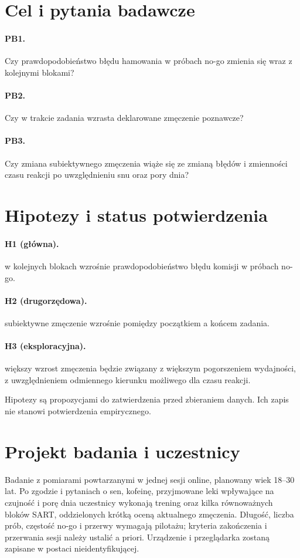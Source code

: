 \documentclass[11pt,a4paper]{article}
\begin{document}
\section{Cel i pytania badawcze}
\paragraph{PB1.} Czy prawdopodobieństwo błędu hamowania w próbach no-go zmienia się wraz z kolejnymi blokami?

\paragraph{PB2.} Czy w trakcie zadania wzrasta deklarowane zmęczenie poznawcze?

\paragraph{PB3.} Czy zmiana subiektywnego zmęczenia wiąże się ze zmianą błędów i zmienności czasu reakcji po uwzględnieniu snu oraz pory dnia?

\section{Hipotezy i status potwierdzenia}
\paragraph{H1 (główna).} w kolejnych blokach wzrośnie prawdopodobieństwo błędu komisji w próbach no-go.

\paragraph{H2 (drugorzędowa).} subiektywne zmęczenie wzrośnie pomiędzy początkiem a końcem zadania.

\paragraph{H3 (eksploracyjna).} większy wzrost zmęczenia będzie związany z większym pogorszeniem wydajności, z uwzględnieniem odmiennego kierunku możliwego dla czasu reakcji.

Hipotezy są propozycjami do zatwierdzenia przed zbieraniem danych. Ich zapis nie stanowi potwierdzenia empirycznego.
\section{Projekt badania i uczestnicy}
Badanie z pomiarami powtarzanymi w jednej sesji online, planowany wiek 18--30 lat. Po zgodzie i pytaniach o sen, kofeinę, przyjmowane leki wpływające na czujność i porę dnia uczestnicy wykonają trening oraz kilka równoważnych bloków SART, oddzielonych krótką oceną aktualnego zmęczenia. Długość, liczba prób, częstość no-go i przerwy wymagają pilotażu; kryteria zakończenia i przerwania sesji należy ustalić a priori. Urządzenie i przeglądarka zostaną zapisane w postaci nieidentyfikującej.
\end{document}
